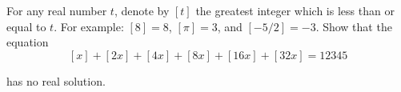 For any real number $t$,  denote by $[t]$ the greatest integer which is less than or equal to $t$.  For example: $[8] = 8$,  $[\pi] = 3$,  and $[-5/2] = -3$.  Show that the equation\[[x] + [2x] + [4x] + [8x] + [16x] + [32x] = 12345\]

has no real solution.